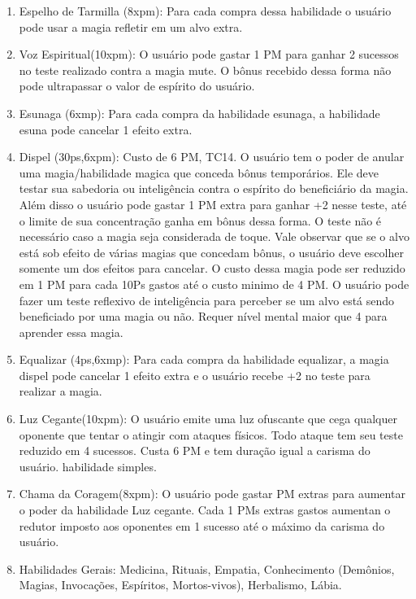 \begin{enumerate}
	\item Espelho de Tarmilla (8xpm): Para cada compra dessa habilidade o usuário pode usar a magia refletir em um alvo extra.	
	
	\item Voz Espiritual(10xpm): O usuário pode gastar 1 PM para ganhar 2 sucessos no teste realizado contra a magia mute. O bônus recebido dessa forma não pode ultrapassar o valor de espírito do usuário.

 \item Esunaga (6xmp): Para cada compra da habilidade esunaga, a habilidade esuna pode cancelar 1 efeito extra.
 
\item Dispel (30ps,6xpm): Custo de 6 PM, TC14.\newline
O usuário tem o poder de anular uma magia/habilidade magica que conceda bônus temporários. Ele deve testar sua sabedoria ou inteligência contra o espírito do beneficiário da magia. Além disso o usuário pode gastar 1 PM extra para ganhar +2 nesse teste, até o limite de sua concentração ganha em bônus dessa forma. O teste não é necessário caso a magia seja considerada de toque. Vale observar que se o alvo está sob efeito de várias magias que concedam bônus, o usuário deve escolher somente um dos efeitos para cancelar. O custo dessa magia pode ser reduzido em 1 PM para cada 10Ps gastos até o custo minimo de 4 PM. O usuário pode fazer um teste reflexivo de inteligência para perceber se um alvo está sendo beneficiado por uma magia ou não. Requer nível mental maior que 4 para aprender essa magia.

\item Equalizar (4ps,6xmp): Para cada compra da habilidade equalizar, a magia dispel pode cancelar 1 efeito extra e o usuário recebe +2 no teste para realizar a magia.

	\item Luz Cegante(10xpm): O usuário emite uma luz ofuscante que cega qualquer oponente que tentar o atingir com ataques físicos. Todo ataque tem seu teste reduzido em 4 sucessos. Custa 6 PM e tem duração igual a carisma do usuário. habilidade simples.
 
 	\item Chama da Coragem(8xpm): O usuário pode gastar PM extras para aumentar o poder da habilidade Luz cegante. Cada 1 PMs extras gastos aumentan o redutor imposto aos oponentes em 1 sucesso até o máximo da carisma do usuário.


	\item Habilidades Gerais: Medicina, Rituais, Empatia, Conhecimento (Demônios, Magias, Invocações, Espíritos, Mortos-vivos), Herbalismo, Lábia.
	
\end{enumerate}

